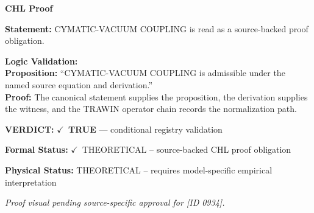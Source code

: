 \vspace{0.45em}
\noindent\textbf{CHL Proof}\par
\textbf{Statement:} CYMATIC-VACUUM COUPLING is read as a source-backed proof obligation.

\textbf{Logic Validation:}\\
\textbf{Proposition:} ``CYMATIC-VACUUM COUPLING is admissible under the named source equation and derivation.''\\
\textbf{Proof:} The canonical statement supplies the proposition, the derivation supplies the witness, and the TRAWIN operator chain records the normalization path.

\textbf{VERDICT:} \ensuremath{\checkmark}\ \textbf{TRUE} --- conditional registry validation

\textbf{Formal Status:} \ensuremath{\checkmark}\ THEORETICAL -- source-backed CHL proof obligation

\textbf{Physical Status:} THEORETICAL -- requires model-specific empirical interpretation
\par\vspace{0.45em}
\par
\vfill
\begingroup\footnotesize\itshape
Proof visual pending source-specific approval for [ID 0934].
\par\endgroup
\vfill
\endgroup
\endgroup

